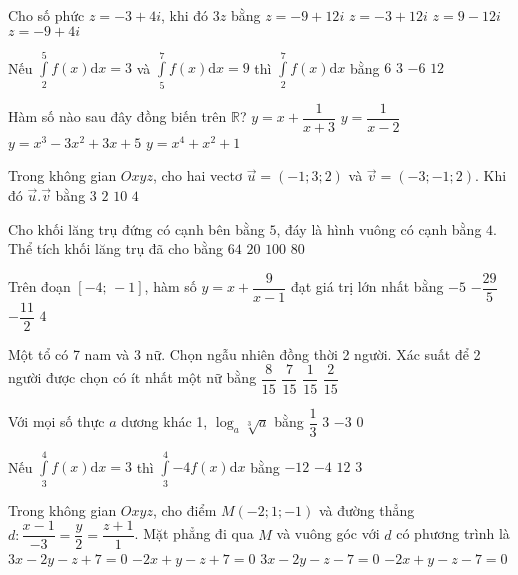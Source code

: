 \begin{ex} %
Cho số phức $z=-3+4i$, khi đó $3z$ bằng 
\choice 
{ \True $z=-9+12i$}
{ $z=-3+12i$}
{ $z=9-12i$}
{ $z=-9+4i$} \end{ex} 
\begin{ex} %
Nếu $\int\limits_{2}^5{f( x )\mathrm{d} x}=3$ và $\int\limits_{5}^{7}{f( x )\mathrm{d} x}=9$ thì $\int\limits_{2}^{7}{f( x )\mathrm{d} x}$ bằng
\choice 
{ $6$}
{ $3$}
{ $-6$}
{ \True $12$} \end{ex} 
\begin{ex} %
Hàm số nào sau đây đồng biến trên $\mathbb{R}$?
\choice 
{ $y=x+\dfrac{1}{x+3}$}
{ $y=\dfrac{1}{x-2}$} 
{ \True $y=x^3-3x^2+3x+5$}
{ $y=x^4+x^2+1$} \end{ex} 
\begin{ex} %
Trong không gian $Oxyz$, cho hai vectơ $\vec{u}=( -1;3;2 )$ và $\vec{v}=( -3;-1;2 )$. Khi đó $\vec{u}.\vec{v}$ bằng
\choice 
{ $3$ }
{ $2$}
{ $10$}
{ \True $4$} \end{ex} 
\begin{ex} %
Cho khối lăng trụ đứng có cạnh bên bằng $5$, đáy là hình vuông có cạnh bằng $4$. Thể tích khối lăng trụ đã cho bằng
\choice 
{ $64$ }
{ $20$}
{ $100$}
{ \True $80$} \end{ex} 
\begin{ex} %
Trên đoạn $[ -4;\,-1 ]$, hàm số $y=x+\dfrac{9}{x-1}$ đạt giá trị lớn nhất bằng
\choice 
{ \True $-5$}
{ $-\dfrac{29}{5}$}
{ $-\dfrac{11}{2}$}
{ $4$} \end{ex} 
\begin{ex} %
Một tổ có 7 nam và 3 nữ. Chọn ngẫu nhiên đồng thời 2 người. Xác suất để 2 người được chọn có ít nhất một nữ bằng
\choice 
{ \True $\dfrac{8}{15}$}
{ $\dfrac{7}{15}$}
{ $\dfrac{1}{15}$}
{ $\dfrac{2}{15}$} \end{ex} 
\begin{ex} %
Với mọi số thực $a$ dương khác 1, ${{\log }_{a}}\sqrt[3]{a}$ bằng
\choice 
{ \True $\dfrac{1}{3}$}
{ $3$}
{ $-3$}
{ $0$} \end{ex} 
\begin{ex} %
Nếu $\int\limits_{3}^4{f( x )\mathrm{d} x}=3$ thì $\int\limits_{3}^4{-4f( x )\mathrm{d} x}$ bằng
\choice 
{ \True $-12$}
{ $-4$}
{ $12$}
{ $3$} \end{ex} 
\begin{ex} %
Trong không gian $Oxyz$, cho điểm $M( -2;1;-1 )$ và đường thẳng $d:\dfrac{x-1}{-3}=\dfrac{y}{2}=\dfrac{z+1}{1}$. Mặt phẳng đi qua $M$ và vuông góc với $d$ có phương trình là
\choice 
{ \True $3x-2y-z+7=0$}
{ $-2x+y-z+7=0$} 
{ $3x-2y-z-7=0$}
{ $-2x+y-z-7=0$} \end{ex} 
